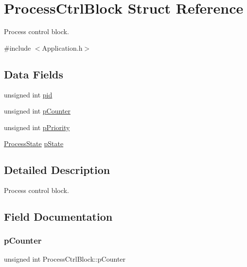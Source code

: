 \hypertarget{struct_process_ctrl_block}{}\section{Process\+Ctrl\+Block Struct Reference}
\label{struct_process_ctrl_block}


Process control block.  




{\ttfamily \#include $<$Application.\+h$>$}

\subsection*{Data Fields}
\begin{DoxyCompactItemize}
\item 
unsigned int \hyperlink{struct_process_ctrl_block_ae46902daea4f3e8dfba195e1a783c7bd}{pid}
\item 
unsigned int \hyperlink{struct_process_ctrl_block_a4f938f5f55fdfad16d487f53ede550f1}{p\+Counter}
\item 
unsigned int \hyperlink{struct_process_ctrl_block_a39549ff84ceba89d2331e8f9b40b44ea}{p\+Priority}
\item 
\hyperlink{_application_8h_a373a58178f69d5e3e1de7516d105675e}{Process\+State} \hyperlink{struct_process_ctrl_block_a760cdacdb53cd9904bcdb4f32e6097b4}{p\+State}
\end{DoxyCompactItemize}


\subsection{Detailed Description}
Process control block. 

\subsection{Field Documentation}
\hypertarget{struct_process_ctrl_block_a4f938f5f55fdfad16d487f53ede550f1}{}\label{struct_process_ctrl_block_a4f938f5f55fdfad16d487f53ede550f1} 
\subsubsection{\texorpdfstring{p\+Counter}{pCounter}}
{\footnotesize\ttfamily unsigned int Process\+Ctrl\+Block\+::p\+Counter}


